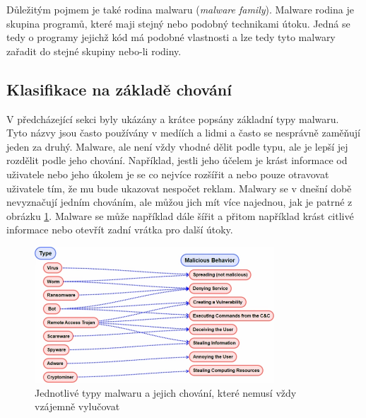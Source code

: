 Důležitým pojmem je také rodina malwaru (\textit{malware family}). Malware rodina je skupina programů, které maji stejný nebo podobný technikami útoku. Jedná se tedy o programy jejichž kód má podobné vlastnosti a lze tedy tyto malwary zařadit do stejné skupiny nebo-li rodiny. 

\subsection*{Klasifikace na základě chování}
V předcházející sekci byly ukázány a krátce popsány základní typy malwaru. Tyto názvy jsou často používány v medíích a lidmi a často se nesprávně zaměňují jeden za druhý.
Malware, ale není vždy vhodné dělit podle typu, ale je lepší jej rozdělit podle jeho chování. Například, jestli jeho účelem je krást informace od uživatele nebo jeho úkolem je se 
co nejvíce rozšířit a nebo pouze otravovat uživatele tím, že mu bude ukazovat nespočet reklam. Malwary se v dnešní době nevyznačují jedním chováním, ale můžou jich mít více najednou, jak 
je patrné z obrázku \ref{behavior}. Malware se může například dále šířit a přitom například krást citlivé informace nebo otevřít zadní vrátka pro další útoky. 

\begin{figure}[h]
	\centering
        \includegraphics[width=0.8\textwidth]{obrazky/behavior.png}
	\caption{Jednotlivé typy malwaru a jejich chování, které nemusí vždy vzájemně vylučovat}
    \label{behavior}
\end{figure}
\newpage

